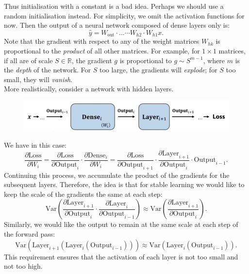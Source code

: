 Thus initialisation with a constant is a bad idea. Perhaps we should use a random initialisation instead. For simplicity, we omit the activation functions for now. Then the output of a neural network composed of dense layers only is:
\begin{equation*}
\hat{y} = W_{\text{out}} \cdot ... \cdots W_{h2} \cdot W_{h1} x.
\end{equation*}
Note that the gradient with respect to any of the weight matrices $W_{hk}$ is proportional to the \textit{product} of all other matrices. For example, for $1 \times 1$ matrices, if all are of scale $S \in \mathbb{R}$, the gradient $g$ is proportional to $g \sim S^{m-1}$, where $m$ is the \textit{depth} of the network. For $S$ too large, the gradients will \textit{explode}; for $S$ too small, they will \textit{vanish}.\\

More realistically, consider a network with hidden layers. 
\begin{figure}[H]
\centering
\includegraphics[scale=0.4]{weightinitialisation.png}
\end{figure} 
We have in this case:
\begin{equation*}
\frac{\partial \textrm{Loss}}{\partial W_i} = \frac{\partial \textrm{Loss}}{\partial \textrm{Output}_i} \cdot \frac{\partial \textrm{Dense}_i}{\partial W_i} = \frac{\partial \textrm{Loss}}{\partial \textrm{Output}_{i+1}} \cdot \frac{\partial \textrm{Layer}_{i+1}}{\partial \textrm{Output}_i} \cdot \textrm{Output}_{i-1}. 
\end{equation*}
Continuing this process, we accumulate the product of the gradients for the subsequent layers. Therefore, the idea is that for stable learning we would like to keep the scale of the gradients the same at each step:
\begin{equation*}
\textrm{Var}\left( \frac{\partial \textrm{Layer}_{i+1}}{\partial \textrm{Output}_i} \cdot \frac{\partial \textrm{Layer}_i}{\partial \textrm{Output}_{i-1}}\right) \approx \textrm{Var}\left( \frac{\partial \textrm{Layer}_{i+1}}{\partial \textrm{Output}_i}\right).
\end{equation*}
Similarly, we would like the output to remain at the same scale at each step of the forward pass:
\begin{equation*}
\textrm{Var}(\textrm{Layer}_{i+1}(\textrm{Layer}_i(\textrm{Output}_{i-1}))) \approx \textrm{Var}(\textrm{Layer}_i(\textrm{Output}_{i-1})).
\end{equation*}
This requirement ensures that the activation of each layer is not too small and not too high.\\

